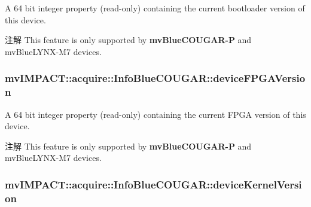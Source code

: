 A 64 bit integer property {\bfseries }(read-\/only) containing the current bootloader version of this device. 

\begin{DoxyNote}{注解}
This feature is only supported by {\bfseries mv\+Blue\+C\+O\+U\+G\+A\+R-\/\+P} and mv\+Blue\+L\+Y\+N\+X-\/\+M7 devices. 
\end{DoxyNote}
\hypertarget{classmv_i_m_p_a_c_t_1_1acquire_1_1_info_blue_c_o_u_g_a_r_af722482084c0e51f8e80b3641334977c}{
\subsubsection[{device\+F\+P\+G\+A\+Version}]{ mv\+I\+M\+P\+A\+C\+T\+::acquire\+::\+Info\+Blue\+C\+O\+U\+G\+A\+R\+::device\+F\+P\+G\+A\+Version}}\label{classmv_i_m_p_a_c_t_1_1acquire_1_1_info_blue_c_o_u_g_a_r_af722482084c0e51f8e80b3641334977c}


A 64 bit integer property {\bfseries }(read-\/only) containing the current F\+P\+G\+A version of this device. 

\begin{DoxyNote}{注解}
This feature is only supported by {\bfseries mv\+Blue\+C\+O\+U\+G\+A\+R-\/\+P} and mv\+Blue\+L\+Y\+N\+X-\/\+M7 devices. 
\end{DoxyNote}
\hypertarget{classmv_i_m_p_a_c_t_1_1acquire_1_1_info_blue_c_o_u_g_a_r_ab6e99b60c4df4323352d9fb1e56a401e}{
\subsubsection[{device\+Kernel\+Version}]{ mv\+I\+M\+P\+A\+C\+T\+::acquire\+::\+Info\+Blue\+C\+O\+U\+G\+A\+R\+::device\+Kernel\+Version}}\label{classmv_i_m_p_a_c_t_1_1acquire_1_1_info_blue_c_o_u_g_a_r_ab6e99b60c4df4323352d9fb1e56a401e}


